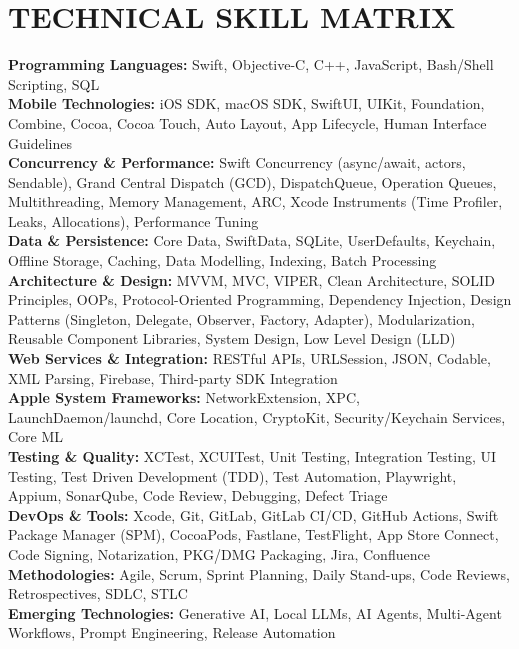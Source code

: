 \documentclass[letterpaper,11pt]{article}
\begin{document}
\section{TECHNICAL SKILL MATRIX}
 \begin{itemize}[leftmargin=0.15in, label={}]
    \small{\item{
     \textbf{Programming Languages:} Swift, Objective-C, C++, JavaScript, Bash/Shell Scripting, SQL \\ \vspace{2pt}
     \textbf{Mobile Technologies:} iOS SDK, macOS SDK, SwiftUI, UIKit, Foundation, Combine, Cocoa, Cocoa Touch, Auto Layout, App Lifecycle, Human Interface Guidelines \\ \vspace{2pt}
     \textbf{Concurrency \& Performance:} Swift Concurrency (async/await, actors, Sendable), Grand Central Dispatch (GCD), DispatchQueue, Operation Queues, Multithreading, Memory Management, ARC, Xcode Instruments (Time Profiler, Leaks, Allocations), Performance Tuning \\ \vspace{2pt}
     \textbf{Data \& Persistence:} Core Data, SwiftData, SQLite, UserDefaults, Keychain, Offline Storage, Caching, Data Modelling, Indexing, Batch Processing \\ \vspace{2pt}
     \textbf{Architecture \& Design:} MVVM, MVC, VIPER, Clean Architecture, SOLID Principles, OOPs, Protocol-Oriented Programming, Dependency Injection, Design Patterns (Singleton, Delegate, Observer, Factory, Adapter), Modularization, Reusable Component Libraries, System Design, Low Level Design (LLD) \\ \vspace{2pt}
     \textbf{Web Services \& Integration:} RESTful APIs, URLSession, JSON, Codable, XML Parsing, Firebase, Third-party SDK Integration \\ \vspace{2pt}
     \textbf{Apple System Frameworks:} NetworkExtension, XPC, LaunchDaemon/launchd, Core Location, CryptoKit, Security/Keychain Services, Core ML \\ \vspace{2pt}
     \textbf{Testing \& Quality:} XCTest, XCUITest, Unit Testing, Integration Testing, UI Testing, Test Driven Development (TDD), Test Automation, Playwright, Appium, SonarQube, Code Review, Debugging, Defect Triage \\ \vspace{2pt}
     \textbf{DevOps \& Tools:} Xcode, Git, GitLab, GitLab CI/CD, GitHub Actions, Swift Package Manager (SPM), CocoaPods, Fastlane, TestFlight, App Store Connect, Code Signing, Notarization, PKG/DMG Packaging, Jira, Confluence \\ \vspace{2pt}
     \textbf{Methodologies:} Agile, Scrum, Sprint Planning, Daily Stand-ups, Code Reviews, Retrospectives, SDLC, STLC \\ \vspace{2pt}
     \textbf{Emerging Technologies:} Generative AI, Local LLMs, AI Agents, Multi-Agent Workflows, Prompt Engineering, Release Automation
    }}
 \end{itemize}
\end{document}
